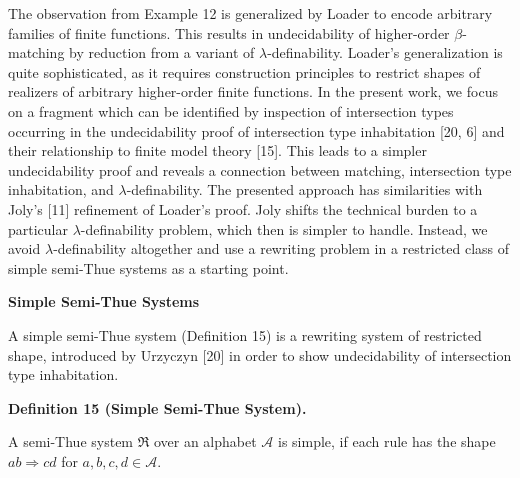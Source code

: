  
 
 
The observation from Example 12 is generalized by Loader to encode arbitrary families of finite functions. This results in undecidability of higher-order $\beta$-matching by reduction from a variant of $\lambda$-definability. Loader’s generalization is quite sophisticated, as it requires construction principles to restrict shapes of realizers of arbitrary higher-order finite functions. In the present work, we focus on a fragment which can be identified by inspection of intersection types occurring in the undecidability proof of intersection type inhabitation [20, 6] and their relationship to finite model theory [15]. This leads to a simpler undecidability proof and reveals a connection between matching, intersection type inhabitation, and $\lambda$-definability. The presented approach has similarities with Joly’s [11] refinement of Loader’s proof. Joly shifts the technical burden to a particular $\lambda$-definability problem, which then is simpler to handle. Instead, we avoid $\lambda$-definability altogether and use a rewriting problem in a restricted class of simple semi-Thue systems as a starting point.\par
 
 
 
 
\par\medskip\noindent\textbf{Simple Semi-Thue Systems}\par
 
 
A simple semi-Thue system (Definition 15) is a rewriting system of restricted shape, introduced by Urzyczyn [20] in order to show undecidability of intersection type inhabitation.\par
 
 
 
\par\medskip\noindent\textbf{Definition 15 (Simple Semi-Thue System).}\par
 
 
A semi-Thue system $\mathfrak{R}$ over an alphabet $\mathcal{A}$ is simple, if each rule has the shape $ab\Rightarrow cd$ for $a,b,c,d\in\mathcal{A}$.\par
 
